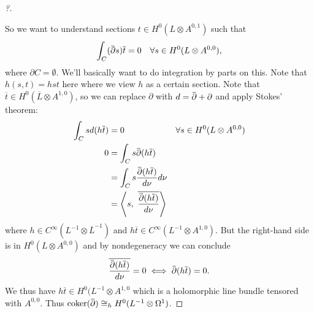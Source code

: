\begin{proof}[?]
\begin{figure}
\centering
{}
\end{figure}

So we want to understand sections \(t\in H^0(L\otimes A^{0, 1})\) such
that
\begin{align*}
\int_C (\mkern 1.5mu\overline{\mkern-1.5mu{\partial}\mkern-1.5mu}\mkern 1.5mus){\overline{{t}}} = 0 && \forall s\in H^0(L\otimes A^{0, 0})
,\end{align*}
where \({{\partial}}C = \emptyset\). We'll basically want to do
integration by parts on this. Note that \(h(s, t) = hst\) here where we
view \(h\) as a certain section. Note that
\({\overline{{t}}} \in H^0({\overline{{L}}} \otimes A^{1, 0})\), so we
can replace \({\partial}\) with
\(d = \mkern 1.5mu\overline{\mkern-1.5mu{\partial}\mkern-1.5mu}\mkern 1.5mu+ {\partial}\)
and apply Stokes' theorem:
\begin{align*}
\int_C s d(h {\overline{{t}}}) &= 0 && \forall s\in H^0(L\otimes A^{0, 0}) \\
0 
&= \int_C s\mkern 1.5mu\overline{\mkern-1.5mu{\partial}\mkern-1.5mu}\mkern 1.5mu(h {\overline{{t}}}) \\
&= \int_C s {\mkern 1.5mu\overline{\mkern-1.5mu{\partial}\mkern-1.5mu}\mkern 1.5mu(h {\overline{{t}}}) \over d\nu}d\nu\\
&= {\left\langle {s},~{{\overline{{\mkern 1.5mu\overline{\mkern-1.5mu{\partial}\mkern-1.5mu}\mkern 1.5mu(h {\overline{{t}}}) \over d\nu }}}} \right\rangle}
\end{align*}
where \(h \in C^{\infty }(L ^{-1} \otimes{\overline{{L}}}^{-1})\) and
\(h{\overline{{t}}} \in C^{\infty }(L^{-1}\otimes A^{1, 0})\). But the
right-hand side is in \(H^0(L \otimes A^{0, 0} )\) and by nondegeneracy
we can conclude
\begin{align*}
{\overline{{\mkern 1.5mu\overline{\mkern-1.5mu{\partial}\mkern-1.5mu}\mkern 1.5mu(h {\overline{{t}}}) \over d\nu }}} = 0
\iff \mkern 1.5mu\overline{\mkern-1.5mu{\partial}\mkern-1.5mu}\mkern 1.5mu(h{\overline{{t}}}) = 0
.\end{align*}
We thus have \(h{\overline{{t}}} \in H^0( L ^{-1}\otimes A^{1, 0}\)
which is a holomorphic line bundle tensored with \(A^{0, 0}\). Thus
\(\operatorname{coker}(\mkern 1.5mu\overline{\mkern-1.5mu{\partial}\mkern-1.5mu}\mkern 1.5mu) \cong_h H^0( L ^{-1} \otimes\Omega^1)\).

\end{proof}

